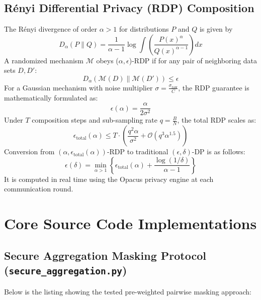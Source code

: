 \documentclass[12pt,a4paper]{report}
\begin{document}
\section{R\'enyi Differential Privacy (RDP) Composition}
The R\'enyi divergence of order $\alpha > 1$ for distributions $P$ and $Q$ is given by
\begin{equation}
    D_\alpha(P \| Q) = \frac{1}{\alpha - 1} \log \int \left( \frac{P(x)^\alpha}{Q(x)^{\alpha - 1}} \right) dx
\end{equation}
A randomized mechanism $\mathcal{M}$ obeys ($\alpha, \epsilon$)-RDP if for any pair of neighboring data sets $D, D'$:
\begin{equation}
    D_\alpha(\mathcal{M}(D) \| \mathcal{M}(D')) \le \epsilon
\end{equation}
For a Gaussian mechanism with noise multiplier $\sigma=\frac{\sigma_{\text{raw}}}{C}$, the RDP guarantee is mathematically formulated as:
\begin{equation}
    \epsilon(\alpha) = \frac{\alpha}{2 \sigma^2}
\end{equation}
Under $T$ composition steps and sub-sampling rate $q = \frac{B}{N}$, the total RDP scales as:
\begin{equation}
    \epsilon_{\text{total}}(\alpha) \le T \cdot \left( \frac{q^2 \alpha}{\sigma^2} + \mathcal{O}(q^3 \alpha^{1.5}) \right)
\end{equation}
Conversion from $(\alpha, \epsilon_{\text{total}}(\alpha))$-RDP to traditional $(\epsilon, \delta)$-DP is as follows:
\begin{equation}
    \epsilon(\delta) = \min_{\alpha > 1} \left\{ \epsilon_{\text{total}}(\alpha) + \frac{\log(1/\delta)}{\alpha - 1} \right\}
\end{equation}
It is computed in real time using the Opacus privacy engine at each communication round.

\newpage
\chapter{Core Source Code Implementations}
\label{app:code_snippets}

\section{Secure Aggregation Masking Protocol (\texttt{secure\_aggregation.py})}
Below is the listing showing the tested pre-weighted pairwise masking approach:
\end{document}
